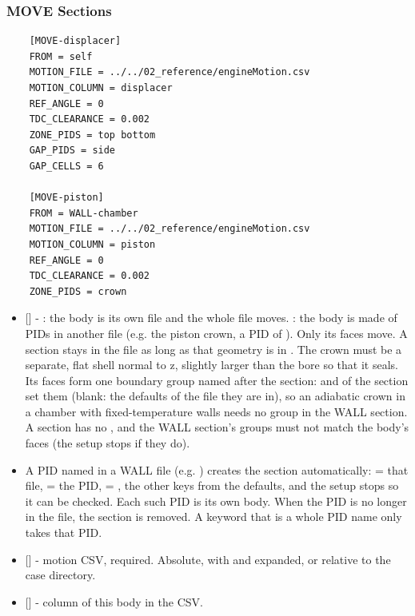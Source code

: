 \subsubsection{MOVE Sections}
\begin{lstlisting}
    [MOVE-displacer]
    FROM = self
    MOTION_FILE = ../../02_reference/engineMotion.csv
    MOTION_COLUMN = displacer
    REF_ANGLE = 0
    TDC_CLEARANCE = 0.002
    ZONE_PIDS = top bottom
    GAP_PIDS = side
    GAP_CELLS = 6

    [MOVE-piston]
    FROM = WALL-chamber
    MOTION_FILE = ../../02_reference/engineMotion.csv
    MOTION_COLUMN = piston
    REF_ANGLE = 0
    TDC_CLEARANCE = 0.002
    ZONE_PIDS = crown
\end{lstlisting}
\begin{itemize}
    \item {} [] - : the body is its own  file and the whole file moves. : the body is made of PIDs in another file (e.g. the piston crown, a PID of ). Only its  faces move. A  section stays in the file as long as that geometry is in . The crown must be a separate, flat shell normal to z, slightly larger than the bore so that it seals. Its faces form one boundary group named after the section:  and  of the  section set them (blank: the defaults of the file they are in), so an adiabatic crown in a chamber with fixed-temperature walls needs no group in the WALL section. A  section has no , and the WALL section's groups must not match the body's faces (the setup stops if they do).
    \item A PID named  in a WALL file (e.g. ) creates the section  automatically:  = that file,  = the PID,  = , the other keys from the defaults, and the setup stops so it can be checked. Each such PID is its own body. When the PID is no longer in the file, the section is removed. A  keyword that is a whole PID name only takes that PID.
    \item {} [] - motion CSV, required. Absolute, with \codeword{~} and  expanded, or relative to the case directory.
    \item {} [] - column of this body in the CSV.

\end{itemize}
